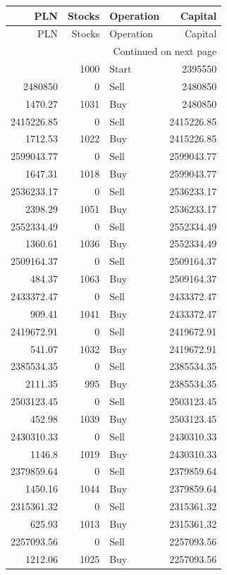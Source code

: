 \begin{longtable}{rrlr}
\toprule
PLN & Stocks & Operation & Capital \\
\midrule
\endfirsthead
\toprule
PLN & Stocks & Operation & Capital \\
\midrule
\endhead
\midrule
\multicolumn{4}{r}{Continued on next page} \\
\midrule
\endfoot
\bottomrule
\endlastfoot
0 & 1000 & Start & 2395550 \\
2480850 & 0 & Sell & 2480850 \\
1470.27 & 1031 & Buy & 2480850 \\
2415226.85 & 0 & Sell & 2415226.85 \\
1712.53 & 1022 & Buy & 2415226.85 \\
2599043.77 & 0 & Sell & 2599043.77 \\
1647.31 & 1018 & Buy & 2599043.77 \\
2536233.17 & 0 & Sell & 2536233.17 \\
2398.29 & 1051 & Buy & 2536233.17 \\
2552334.49 & 0 & Sell & 2552334.49 \\
1360.61 & 1036 & Buy & 2552334.49 \\
2509164.37 & 0 & Sell & 2509164.37 \\
484.37 & 1063 & Buy & 2509164.37 \\
2433372.47 & 0 & Sell & 2433372.47 \\
909.41 & 1041 & Buy & 2433372.47 \\
2419672.91 & 0 & Sell & 2419672.91 \\
541.07 & 1032 & Buy & 2419672.91 \\
2385534.35 & 0 & Sell & 2385534.35 \\
2111.35 & 995 & Buy & 2385534.35 \\
2503123.45 & 0 & Sell & 2503123.45 \\
452.98 & 1039 & Buy & 2503123.45 \\
2430310.33 & 0 & Sell & 2430310.33 \\
1146.8 & 1019 & Buy & 2430310.33 \\
2379859.64 & 0 & Sell & 2379859.64 \\
1450.16 & 1044 & Buy & 2379859.64 \\
2315361.32 & 0 & Sell & 2315361.32 \\
625.93 & 1013 & Buy & 2315361.32 \\
2257093.56 & 0 & Sell & 2257093.56 \\
1212.06 & 1025 & Buy & 2257093.56 \\

\end{longtable}
